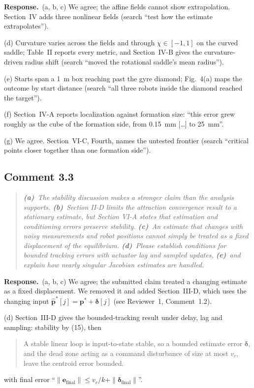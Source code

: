 \documentclass[10pt]{article}
\newcommand{\rev}[1]{#1}                             %
\newcommand{\resp}{\par\textbf{Response.}~}
\newenvironment{newtext}{\begin{quote}\small\sloppy}{\end{quote}}
\begin{document}
\resp (a, b, c) We agree; the affine fields cannot show extrapolation. Section~IV adds three nonlinear fields (search ``test how the estimate extrapolates'').

(d) Curvature varies across the fields and through $\chi \in [-1, 1]$ on the curved saddle; Table~II reports every metric, and Section~IV-B gives the curvature-driven radius shift (search ``moved the rotational saddle's mean radius'').

(e) Starts span a 1~m box reaching past the gyre diamond; Fig.~4(a) maps the outcome by start distance (search ``all three robots inside the diamond reached the target'').

(f) Section~IV-A reports localization against formation size: ``this error grew roughly as the cube of the formation side, from \rev{0.15}~mm [\ldots] to \rev{25}~mm''.

(g) We agree. Section~VI-C, Fourth, names the untested frontier (search ``critical points closer together than one formation side'').

\subsection*{Comment 3.3}

\begin{quote}\itshape
\textbf{(a)}~The stability discussion makes a stronger claim than the analysis supports.
\textbf{(b)}~Section II-D limits the attraction convergence result to a stationary estimate, but Section VI-A states that estimation and conditioning errors preserve stability.
\textbf{(c)}~An estimate that changes with noisy measurements and robot positions cannot simply be treated as a fixed displacement of the equilibrium.
\textbf{(d)}~Please establish conditions for bounded tracking errors with actuator lag and sampled updates,
\textbf{(e)}~and explain how nearly singular Jacobian estimates are handled.
\end{quote}

\resp (a, b, c) We agree; the submitted claim treated a changing estimate as a fixed displacement. We removed it and added Section~III-D, which uses the changing input $\hat{\mathbf{p}}^*[j] = \mathbf{p}^* + \boldsymbol\delta[j]$ (see Reviewer~1, Comment~1.2).

(d) Section~III-D gives the bounded-tracking result under delay, lag and sampling: stability by (15), then
\begin{newtext}
A stable linear loop is input-to-state stable, so a bounded estimate error $\boldsymbol{\delta}$, and the dead zone acting as a command disturbance of size at most $v_c$, leave the centroid error bounded.
\end{newtext}
with final error ``$\|\mathbf{e}_{\text{final}}\| \le v_c/k + \|\boldsymbol{\delta}_{\text{final}}\|$''.
\end{document}

